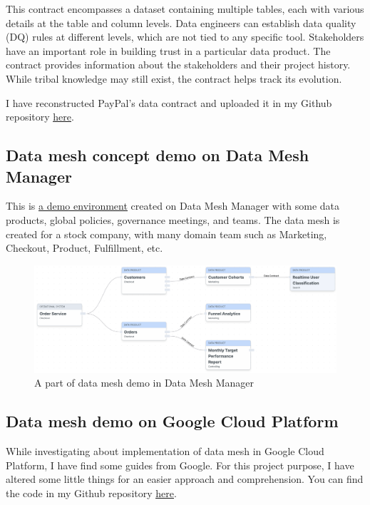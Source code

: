 \documentclass[12pt, a4paper]{book}
\begin{document}
This contract encompasses a dataset containing multiple tables, each with various details at the table and column levels. Data engineers can establish data quality (DQ) rules at different levels, which are not tied to any specific tool. Stakeholders have an important role in building trust in a particular data product. The contract provides information about the stakeholders and their project history. While tribal knowledge may still exist, the contract helps track its evolution.

I have reconstructed PayPal's data contract and uploaded it in my Github repository \href{https://github.com/ngocminhta/DataMeshReport/tree/main/DataContractPayPal.md}{\underline{here}}.

\subsection{Data mesh concept demo on Data Mesh Manager}
This is \href{https://demo.datamesh-manager.com/}{\underline{a demo environment}} created on Data Mesh Manager with some data products, global policies, governance meetings, and teams. The data mesh is created for a stock company, with many domain team such as Marketing, Checkout, Product, Fulfillment, etc.

\begin{figure}[ht]
	\vspace{-.2cm}
	\begin{framed}
		\centering
		\includegraphics[width=13cm]{DataMeshManagerDemo.png}
		\caption{A part of data mesh demo in Data Mesh Manager}
		\label{DataMeshManagerDemo}
	\end{framed}
	\vspace{-.5cm}
\end{figure}

\subsection{Data mesh demo on Google Cloud Platform}
While investigating about implementation of data mesh in Google Cloud Platform, I have find some guides from Google. For this project purpose, I have altered some little things for an easier approach and comprehension. You can find the code in my Github repository \href{https://github.com/ngocminhta/DataMeshDemoGCP}{\underline{here}}.
\end{document}
